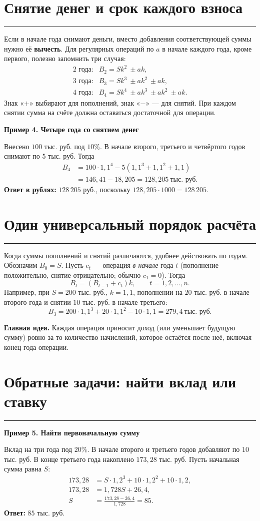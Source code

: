 \documentclass[a4paper,12pt]{article}
\newcommand{\lessonsection}[1]{\section{#1}\vspace{-0.2em}\noindent\textcolor{accent}{\rule{\linewidth}{0.55pt}}\vspace{0.2em}}
\newcommand{\keyidea}[1]{\par\noindent\textcolor{darkaccent}{\textbf{Главная идея.}} #1\par}
\newcommand{\exampletitle}[1]{\par\smallskip\noindent\textcolor{darkaccent}{\textbf{#1}}\par}
\begin{document}
\lessonsection{Снятие денег и срок каждого взноса}
Если в начале года снимают деньги, вместо добавления соответствующей суммы нужно её \textbf{вычесть}. Для регулярных операций по $a$ в начале каждого года, кроме первого, полезно запомнить три случая:
\[
\begin{array}{ll}
\text{2 года:}& B_2=Sk^2\ \pm ak,\\[2mm]
\text{3 года:}& B_3=Sk^3\ \pm ak^2\ \pm ak,\\[2mm]
\text{4 года:}& B_4=Sk^4\ \pm ak^3\ \pm ak^2\ \pm ak.
\end{array}
\]
Знак «$+$» выбирают для пополнений, знак «$-$» --- для снятий. При каждом снятии сумма на счёте должна оставаться достаточной для операции.

\exampletitle{Пример 4. Четыре года со снятием денег}
Внесено $100$ тыс. руб. под $10\%$. В начале второго, третьего и четвёртого годов снимают по $5$ тыс. руб. Тогда
\[
\begin{aligned}
B_4&=100\cdot1{,}1^4-5(1{,}1^3+1{,}1^2+1{,}1)\\
&=146{,}41-18{,}205=128{,}205\ \text{тыс. руб.}
\end{aligned}
\]
\textbf{Ответ в рублях:} $128\,205$ руб., поскольку $128{,}205\cdot1000=128\,205$.

\lessonsection{Один универсальный порядок расчёта}
Когда суммы пополнений и снятий различаются, удобнее действовать по годам. Обозначим $B_0=S$. Пусть $c_t$ --- операция \emph{в начале} года $t$ (пополнение положительно, снятие отрицательно; обычно $c_1=0$). Тогда
\[
\boxed{\displaystyle B_t=(B_{t-1}+c_t)k,\qquad t=1,2,\ldots,n.}
\]
Например, при $S=200$ тыс. руб., $k=1{,}1$, пополнении на $20$ тыс. руб. в начале второго года и снятии $10$ тыс. руб. в начале третьего:
\[
B_3=200\cdot1{,}1^3+20\cdot1{,}1^2-10\cdot1{,}1
=279{,}4\ \text{тыс. руб.}
\]
\keyidea{Каждая операция приносит доход (или уменьшает будущую сумму) ровно за то количество начислений, которое остаётся после неё, включая конец года операции.}

\lessonsection{Обратные задачи: найти вклад или ставку}
\exampletitle{Пример 5. Найти первоначальную сумму}
Вклад на три года под $20\%$. В начале второго и третьего годов добавляют по $10$ тыс. руб. В конце третьего года накоплено $173{,}28$ тыс. руб. Пусть начальная сумма равна $S$:
\[
\begin{aligned}
173{,}28&=S\cdot1{,}2^3+10\cdot1{,}2^2+10\cdot1{,}2,\\
173{,}28&=1{,}728S+26{,}4,\\
S&=\frac{173{,}28-26{,}4}{1{,}728}=85.
\end{aligned}
\]
\textbf{Ответ:} $85$ тыс. руб.
\end{document}
